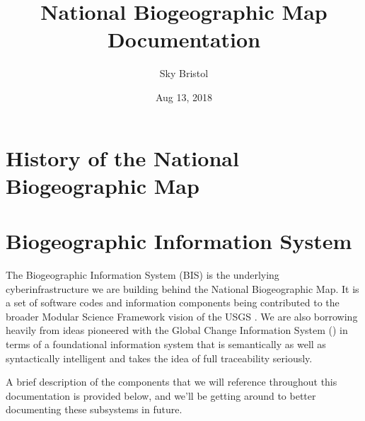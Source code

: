 \documentclass[letterpaper,10pt,english]{sphinxmanual}
\title{National Biogeographic Map Documentation}
\date{Aug 13, 2018}
\author{Sky Bristol}
\begin{document}
\maketitle
\sphinxtableofcontents
{}\label{\detokenize{index::doc}}



\chapter{History of the National Biogeographic Map}
\label{\detokenize{history:history-of-the-national-biogeographic-map}}\label{\detokenize{history:usgs-national-biogeographic-map}}\label{\detokenize{history::doc}}

\chapter{Biogeographic Information System}
\label{\detokenize{bis:biogeographic-information-system}}\label{\detokenize{bis:bis}}\label{\detokenize{bis::doc}}
The Biogeographic Information System (BIS) is the underlying cyberinfrastructure we are building behind the National Biogeographic Map. It is a set of software codes and information components being contributed to the broader Modular Science Framework vision of the USGS \label{\detokenize{bis:id1}}{\hyperref[\detokenize{references:csssciencestrategy}]{\sphinxcrossref{{[}CSSScienceStrategy{]}}}}. We are also borrowing heavily from ideas pioneered with the Global Change Information System () in terms of a foundational information system that is semantically as well as syntactically intelligent and takes the idea of full traceability seriously.

A brief description of the components that we will reference throughout this documentation is provided below, and we’ll be getting around to better documenting these subsystems in future.
\end{document}
